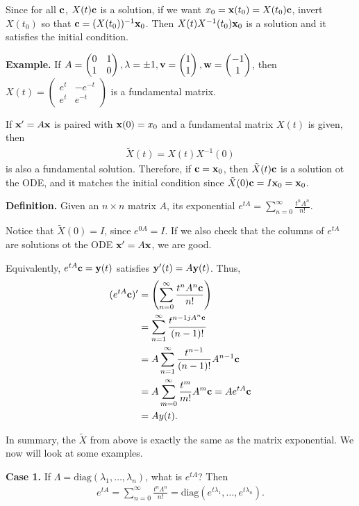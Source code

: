 \documentclass{article}
\newcommand{\mat}[1]{\begin{pmatrix}#1\end{pmatrix}}
\begin{document}
Since for all $\mathbf{c}$, $X(t) \mathbf{c}$ is a solution, if we want $x_0 = \mathbf{x}(t_0) = X(t_0) \mathbf{c}$, invert $X (t_0)$ so that $\mathbf{c} = (X(t_0))^{-1} \mathbf{x}_0$.  Then $X(t) X^{-1} (t_0) \mathbf{x}_0$ is a solution and it satisfies the initial condition.

{\bf Example.} If $A = \mat{0 & 1 \\ 1 & 0}, \lambda = \pm 1, \mbf{v} = \mat{1 \\ 1}, \mbf{w} = \mat{-1 \\ 1}$, then $X(t) = \mat{e^{t} & -e^{-t} \\ e^{t} & e^{-t}}$ is a fundamental matrix.

If $\mathbf{x}' = A \mathbf{x}$ is paired with $\mathbf{x}(0) = x_0$ and a fundamental matrix $X(t)$ is given, then
\begin{align*}
  \tilde{X}(t) = X(t) X^{-1}(0)
\end{align*}
is also a fundamental solution.  Therefore, if $\mathbf{c} = \mathbf{x}_0$, then $\tilde{X}(t) \mathbf{c}$ is a solution ot the ODE, and it matches the initial condition since $\tilde{X}(0) \mathbf{c} = I \mathbf{x}_0 = \mathbf{x}_0$.

{\bf Definition.} Given an $n \times n$ matrix $A$, its exponential $e^{tA} = \sum_{n=0}^{\infty} \frac{t^n A^n}{n!}$.

Notice that $\tilde{X}(0) = I$, since $e^{0A} = I$.  If we also check that the columns of $e^{tA}$ are solutions ot the ODE $\mathbf{x}' = A \mathbf{x}$, we are good.

Equivalently, $e^{tA} \mathbf{c} = \mathbf{y}(t)$ satisfies $\mathbf{y}'(t) = A \mathbf{y}(t)$.  Thus,
\begin{align*}
  (e^{tA} \mathbf{c})' &= \left( \sum_{n=0}^{\infty} \frac{t^n A^n \mathbf{c}}{n!} \right) \\
  &= \sum_{n=1}^{\infty} \frac{t^{n-1j A^n \mathbf{c}}}{(n-1)!} \\
  &= A \sum_{n=1}^{\infty} \frac{t^{n-1}}{(n-1)!} A^{n-1} \mathbf{c} \\
  &= A \sum_{m=0}^{\infty} \frac{t^m}{m!} A^m \mathbf{c} = A e^{tA} \mathbf{c} \\
  &= A y(t).
\end{align*}

In summary, the $\tilde{X}$ from above is exactly the same as the matrix exponential.  We now will look at some examples.

{\bf Case 1.} If $\Lambda = \text{diag}(\lambda_1, \dots, \lambda_n)$, what is $e^{tA}$?  Then
\begin{align*}
  e^{tA} = \sum_{n=0}^{\infty} \frac{t^n \Lambda^n}{n!} = \text{diag}(e^{t \lambda_1}, \dots, e^{t \lambda_n}).
\end{align*}
\end{document}

